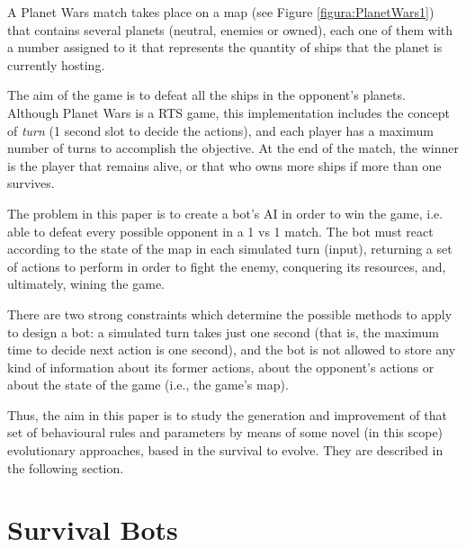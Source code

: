\documentclass[conference]{IEEEtran}
\begin{document}
A Planet Wars match takes place on a map (see Figure \ref{figura:PlanetWars1}) that contains several planets (neutral, enemies or owned), each one of them with a number assigned to it that represents the quantity of ships that the planet is currently hosting.

The aim of the game is to defeat all the ships in the opponent's planets. Although Planet Wars is a RTS game, this implementation includes the concept of {\em turn} (1 second slot to decide the actions), and each player has a maximum number of turns to accomplish the objective. At the end of the match, the winner is the player that remains alive, or that who owns more ships if more than one survives.

The problem in this paper is to create a bot's AI in order to win the game, i.e. able to defeat every possible opponent in a 1 vs 1 match.%
 The bot must react according to the state of the map in each simulated turn (input), returning a set of actions to perform in order to fight the enemy, conquering its resources, and, ultimately, wining the game.

There are two strong constraints which determine the possible methods to apply to design a bot: a simulated turn takes just one second (that is, the maximum time to decide next action is one second), and the bot is not allowed to store any kind of information about its former actions, about the opponent's actions or about the state of the game (i.e., the game's map).


Thus, the aim in this paper is to study the generation and improvement of that set of behavioural rules and parameters by means of some novel (in this scope) evolutionary approaches, based in the survival to evolve. They are described in the following section.


%
\section{Survival Bots}
\label{sec:survival_bots}
\end{document}
